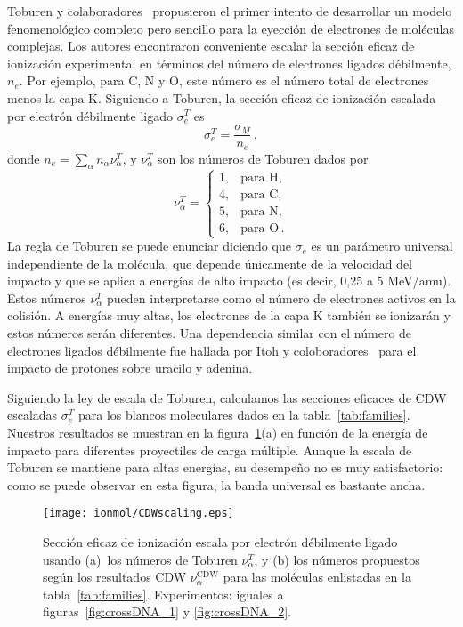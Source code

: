 Toburen y colaboradores~\cite{toburen1975,toburen1976} propusieron el 
primer intento de desarrollar un modelo fenomenológico completo pero 
sencillo para la eyección de electrones de moléculas complejas. Los 
autores encontraron conveniente escalar la sección eficaz de ionización 
experimental en términos del número de electrones ligados débilmente, $n_e$.
Por ejemplo, para C, N y O, este número es el número total de 
electrones menos la capa K. Siguiendo a Toburen, la sección eficaz de 
ionización escalada por electrón débilmente ligado $\sigma_{e}^T$ es
\begin{equation}
\sigma_{e}^T=\frac{\sigma_{M}}{n_e}\,, 
\label{27} 
\end{equation}
donde $n_e=\sum_{\alpha}n_{\alpha}\nu_{\alpha}^T$, y $\nu_{\alpha}^T$ 
son los números de Toburen dados por
\begin{equation}
\nu_{\alpha}^T=\left\{ 
\begin{array}{ll}
1, & \text{para H,} \\
4, & \text{para C,} \\ 
5, & \text{para N,} \\ 
6, & \text{para O}\,.
\end{array}\right.
\label{eq:nelec} 
\end{equation} 
La regla de Toburen se puede enunciar diciendo que $\sigma_{e}$ es un 
parámetro universal independiente de la molécula, que depende únicamente 
de la velocidad del impacto y que se aplica a energías de alto impacto 
(es decir, 0,25 a 5 MeV/amu). Estos números $\nu_{\alpha}^T$ pueden 
interpretarse como el número de electrones activos en la colisión. A 
energías muy altas, los electrones de la capa K también se ionizarán y 
estos números serán diferentes. Una dependencia similar con el número de 
electrones ligados débilmente fue hallada por Itoh y 
coloboradores~\cite{itoh2013} para el impacto de protones sobre uracilo 
y adenina.

Siguiendo la ley de escala de Toburen, calculamos las secciones eficaces 
de CDW escaladas $\sigma_{e}^T$ para los blancos moleculares dados en la
tabla~\ref{tab:families}. Nuestros resultados se muestran en la 
figura~\ref{fig:newscaling}(a) en función de la energía de impacto para 
diferentes proyectiles de carga múltiple. Aunque la escala de Toburen 
se mantiene para altas energías, su desempeño no es muy satisfactorio: 
como se puede observar en esta figura, la banda universal es bastante 
ancha.

\begin{figure}
\centering
\texttt{[image: ionmol/CDWscaling.eps]}
\caption[Sección eficaz de ionización escalada por $n_e$.]
{Sección eficaz de ionización escala por electrón débilmente ligado 
usando (a)~los números de Toburen $\nu_{\alpha}^T$, y (b) los
números propuestos según los resultados CDW $\nu_{\alpha}^{\text{CDW}}$ 
para las moléculas enlistadas en la tabla~\ref{tab:families}. 
Experimentos: iguales a figuras~\ref{fig:crossDNA_1} y 
\ref{fig:crossDNA_2}.}
\label{fig:newscaling}
\end{figure}

